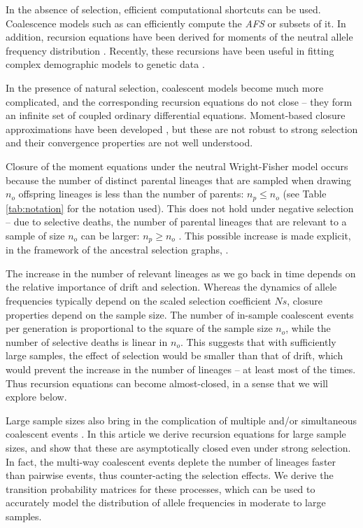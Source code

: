 \documentclass[review]{elsarticle}
\begin{document}
In the absence of selection, efficient computational shortcuts can be used. Coalescence models such
as \citep{fastsimcoal2, KammEtAl2017} can efficiently compute the \textit{AFS} or subsets of it. In
addition, recursion equations have been derived for moments of the neutral allele frequency
distribution \citep{KimuraCrow1964,Ewens1972,JouganousEtAl2017}. Recently, these recursions have
been useful in fitting complex demographic models to genetic data
\citep{JouganousEtAl2017,KammEtAl2017}.
 
In the presence of natural selection, coalescent models become much more complicated, and the
corresponding recursion equations do not close \citep{DonnellyKurtz1999, JouganousEtAl2017} -- they
form an infinite set of coupled ordinary differential equations. Moment-based closure approximations
have been developed \citep{JouganousEtAl2017}, but these are not robust to strong selection and
their convergence properties are not well understood.

Closure of the moment equations under the neutral Wright-Fisher model occurs because the number of
distinct parental lineages that are sampled when drawing $n_o$ offspring lineages is less than the
number of parents: $n_p \le n_o$ (see Table \ref{tab:notation} for the notation used). This does not
hold under negative selection -- due to selective deaths, the number of parental lineages that are
relevant to a sample of size $n_o$ can be larger: $n_p \ge n_o$ \citep{DonnellyKurtz1999a,
  JouganousEtAl2017}. This possible increase is made explicit, in the framework of the ancestral
selection graphs, \citep{KroneNeuhauser1997}.

The increase in the number of relevant lineages as we go back in time depends on the relative
importance of drift and selection. Whereas the dynamics of allele frequencies typically depend on
the scaled selection coefficient $Ns$, closure properties depend on the sample size. The number of
in-sample coalescent events per generation is proportional to the square of the sample size $n_o$,
while the number of selective deaths is linear in $n_o$. This suggests that with sufficiently large
samples, the effect of selection would be smaller than that of drift, which would prevent the
increase in the number of lineages -- at least most of the times. Thus recursion equations can
become almost-closed, in a sense that we will explore below.

Large sample sizes also bring in the complication of multiple and/or simultaneous coalescent events
\citep{BhaskarEtAl2014}. In this article we derive recursion equations for large sample sizes, and
show that these are asymptotically closed even under strong selection. In fact, the multi-way
coalescent events deplete the number of lineages faster than pairwise events, thus counter-acting
the selection effects. We derive the transition probability matrices for these processes, which can
be used to accurately model the distribution of allele frequencies in moderate to large samples.
\end{document}
